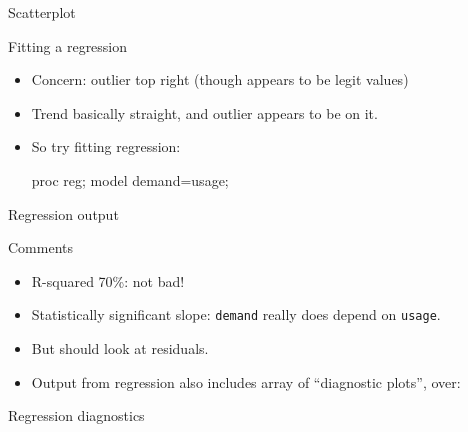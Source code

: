 \documentclass[unknownkeysallowed]{beamer}\usepackage[]{graphicx}\usepackage[]{color}
\begin{document}
\begin{frame}[fragile]{Scatterplot}


\end{frame}

\begin{frame}[fragile]{Fitting a regression}

  \begin{itemize}
  \item Concern: outlier top right (though appears to be legit values)
  \item Trend basically straight, and outlier appears to be on it.
  \item So try fitting regression:

    \begin{Sascode}[store=ddb]
proc reg;
  model demand=usage;      
    \end{Sascode}
    

  \end{itemize}
  
\end{frame}


\begin{frame}[fragile]{Regression output}



\end{frame}

\begin{frame}[fragile]{Comments}

  \begin{itemize}
  \item R-squared 70\%: not bad!
  \item Statistically significant slope: \texttt{demand} really does
    depend on \texttt{usage}.
  \item But should look at residuals.
  \item Output from regression also includes array of ``diagnostic
    plots'', over:

  \end{itemize}

\end{frame}

\begin{frame}[fragile]{Regression diagnostics}
  
  
\end{frame}
\end{document}
